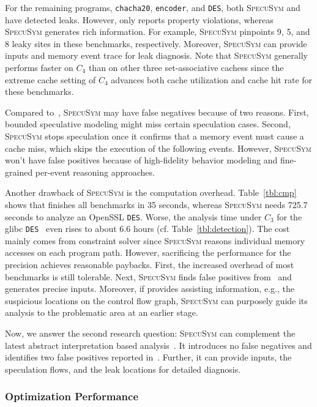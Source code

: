 \documentclass[sigconf,screen]{acmart}
\newcommand{\SpecuSym}{\textsc{SpecuSym} }
\begin{document}
For the remaining programs, \texttt{chacha20}, \texttt{encoder}, and \texttt{DES}, 
both \SpecuSym and~\cite{WuW19} have detected leaks. However, \cite{WuW19} only 
reports property violations, whereas \SpecuSym generates rich information. For 
example, \SpecuSym pinpoints 9, 5, and 8 leaky sites in these benchmarks, respectively. 
Moreover, \SpecuSym can provide inputs and memory event trace for leak diagnosis. 
Note that \SpecuSym generally performs faster on $C_4$ than on other three 
set-associative cachess since the extreme cache setting of $C_4$ advances both cache 
utilization and cache hit rate for these benchmarks. 


Compared to~\cite{WuW19}, \SpecuSym may have false negatives because of two reasons. 
First, bounded speculative modeling might miss certain speculation cases. Second, \SpecuSym 
stops speculation once it confirms that a memory event must cause a cache miss, which 
skips the execution of the following events. However, \SpecuSym won't have false 
positives because of high-fidelity behavior modeling and fine-grained per-event 
reasoning approaches. 



Another drawback of \SpecuSym is the computation overhead. Table~\ref{tbl:cmp} shows 
that \cite{WuW19} finishes all benchmarks in 35 seconds, whereas \SpecuSym needs 
725.7 seconds to analyze an OpenSSL {\tt{DES}}. Worse, the analysis time under 
$C_3$ for the glibc \texttt{DES}~\cite{glibc} even rises to about 6.6 hours (cf.
Table~\ref{tbl:detection}). The cost mainly comes from constraint solver since 
\SpecuSym reasons individual memory accesses on each program path. However, 
sacrificing the performance for the precision achieves reasonable paybacks. First, 
the increased overhead of most benchmarks is still tolerable. Next, \SpecuSym finds 
false positives from~\cite{WuW19} and generates precise inputs. Moreover, if
\cite{WuW19} provides assisting information, e.g., the suspicious locations on the 
control flow graph, \SpecuSym can purposely guide its analysis to the problematic 
area at an earlier stage. 


Now, we answer the second research question: \SpecuSym can complement the latest 
abstract interpretation based analysis~\cite{WuW19}. It introduces no false negatives 
and identifies two false positives reported in~\cite{WuW19}. Further, it can provide
inputs, the speculation flows, and the leak locations for detailed diagnosis.


\subsubsection{Optimization Performance}
\label{sec:opt_perform}
\end{document}
